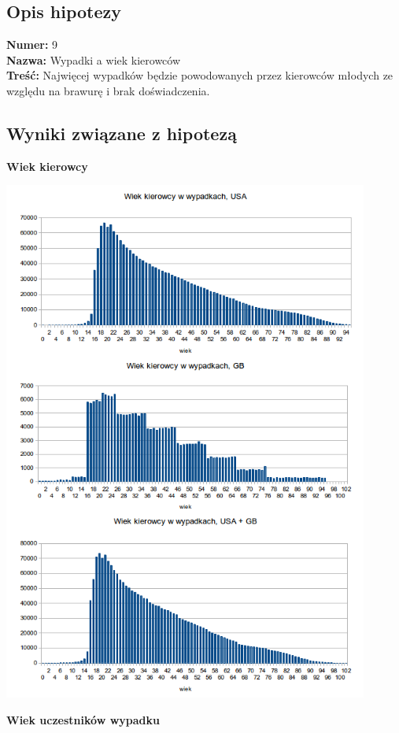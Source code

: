 \subsection{Opis hipotezy}\label{opis-hipotezy}

\textbf{Numer:} 9\\\textbf{Nazwa:} Wypadki a wiek
kierowców\\\textbf{Treść:} Najwięcej wypadków będzie powodowanych przez
kierowców młodych ze względu na brawurę i brak doświadczenia.

\subsection{Wyniki związane z
hipotezą}\label{wyniki-zwiazane-z-hipoteza}

\textbf{Wiek kierowcy}

\centerline{\includegraphics[width=0.9\textwidth]{images/statistics/driver_age.png}}

\textbf{Wiek uczestników wypadku}

